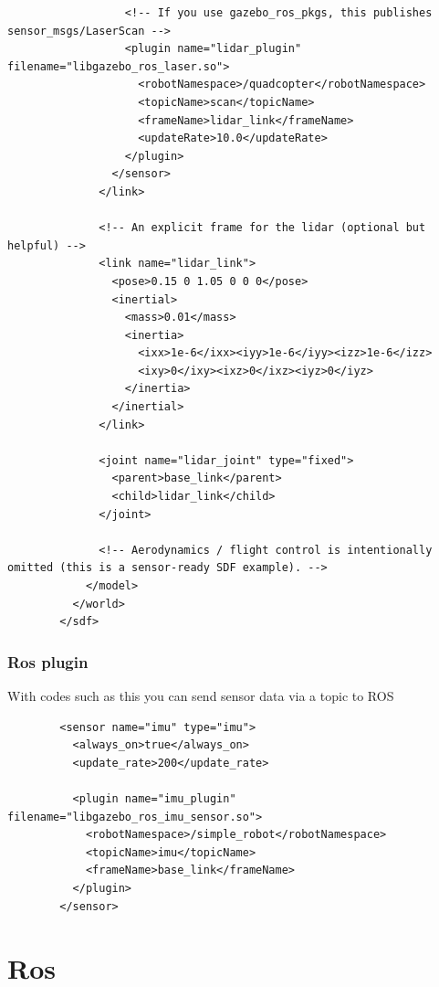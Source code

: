 \documentclass{book}
\begin{document}
\begin{verbatim}
                  <!-- If you use gazebo_ros_pkgs, this publishes sensor_msgs/LaserScan -->
                  <plugin name="lidar_plugin" filename="libgazebo_ros_laser.so">
                    <robotNamespace>/quadcopter</robotNamespace>
                    <topicName>scan</topicName>
                    <frameName>lidar_link</frameName>
                    <updateRate>10.0</updateRate>
                  </plugin>
                </sensor>
              </link>
        
              <!-- An explicit frame for the lidar (optional but helpful) -->
              <link name="lidar_link">
                <pose>0.15 0 1.05 0 0 0</pose>
                <inertial>
                  <mass>0.01</mass>
                  <inertia>
                    <ixx>1e-6</ixx><iyy>1e-6</iyy><izz>1e-6</izz>
                    <ixy>0</ixy><ixz>0</ixz><iyz>0</iyz>
                  </inertia>
                </inertial>
              </link>
        
              <joint name="lidar_joint" type="fixed">
                <parent>base_link</parent>
                <child>lidar_link</child>
              </joint>
        
              <!-- Aerodynamics / flight control is intentionally omitted (this is a sensor-ready SDF example). -->
            </model>
          </world>
        </sdf>
    \end{verbatim}

\subsubsection{Ros plugin}


With codes such as this you can send sensor data via a topic to ROS
    \begin{verbatim}
        <sensor name="imu" type="imu">
          <always_on>true</always_on>
          <update_rate>200</update_rate>
        
          <plugin name="imu_plugin" filename="libgazebo_ros_imu_sensor.so">
            <robotNamespace>/simple_robot</robotNamespace>
            <topicName>imu</topicName>
            <frameName>base_link</frameName>
          </plugin>
        </sensor>
    \end{verbatim}

\section{Ros}
\end{document}
